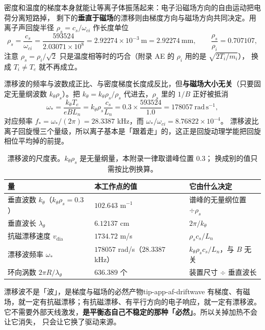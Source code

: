 密度和温度的梯度本身就能让等离子体振荡起来：电子沿磁场方向的自由运动把电荷分离短路掉，
剩下的\textbf{垂直于磁场}的漂移则由梯度方向与磁场方向共同决定。用离子声回旋半径 $\rho_s=c_s/\omega_{ci}$ 作长度单位
\begin{equation}
\rho_s=\frac{c_s}{\omega_{ci}}=\frac{593524}{2.03071\times10^{8}}
=2.92274\times10^{-3}\ \mathrm{m}=2.92274\ \mathrm{mm},
\qquad
\frac{\rho_s}{\rho_i}=0.707107,
\label{eq:app-af-rhos}
\end{equation}
注意 $\rho_s=\rho_i/\sqrt{2}$ 只是温度相等时的巧合（附录 AE 的 $\rho_i$ 用的是 $\sqrt{2T_i/m_i}$），
换成 $T_i\ne T_e$ 就不再成立。

漂移波的频率与波数成正比、与密度梯度长度成反比，但\textbf{与磁场大小无关}（只要固定无量纲波数
$k_\theta\rho_s$）。把 $k_\theta=k_\theta\rho_s/\rho_s$ 代进去，$\rho_s$ 里的 $1/B$ 正好被抵消
\begin{equation}
\omega_*=\frac{k_\theta T_e}{eBL_n}=k_\theta\rho_s\frac{c_s}{L_n}
=0.3\times\frac{593524}{1.0}=178057\ \mathrm{rad\,s^{-1}},
\label{eq:app-af-omega-star}
\end{equation}
对应频率 $f_*=\omega_*/(2\pi)=28.3387$ kHz，而 $\omega_*/\omega_{ci}=8.76822\times10^{-4}$。
漂移波比离子回旋慢三个量级，所以离子基本是「跟着走」的，这正是回旋动理学能把回旋相位平均掉的前提。

\begin{table}[htbp]
\centering
\small
\caption{漂移波的尺度表。$k_\theta\rho_s$ 是无量纲量，本附录一律取谱峰位置 $0.3$；
换成别的值只需按比例换算。}
\label{tab:app-af-driftwave}
\begin{tabular}{p{4.2cm}p{3.4cm}p{5.2cm}}
\toprule
量 & 本工作点的值 & 它由什么决定 \\
\midrule
垂直波数 $k_\theta$（$k_\theta\rho_s=0.3$） & $102.643$ m$^{-1}$ & 谱峰的无量纲位置 $\div\rho_s$ \\
垂直波长 $\lambda_\theta$ & $6.12137$ cm & $2\pi/k_\theta$ \\
抗磁漂移速度 $v_{\mathrm{dia}}$ & $1734.72$ m/s & $\rho_sc_s/L_n$ \\
漂移波频率 $\omega_*$ & $178057$ rad/s（$28.3387$ kHz） & $k_\theta\rho_sc_s/L_n$，与 $B$ 无关 \\
环向涡数 $2\pi R/\lambda_\theta$ & $636.389$ 个 & 装置尺寸 $\div$ 垂直波长 \\
\bottomrule
\end{tabular}

\end{table}

\begin{tip}{漂移波不是「波」，是梯度与磁场的必然产物}{tip-app-af-driftwave}
有梯度、有磁场，就一定有抗磁漂移；有抗磁漂移、有平行方向的电子响应，就一定有漂移波。
它不需要外部天线激发，\textbf{是平衡态自己不稳定的那种「必然」}。所以关掉加热不会让它消失，
只会让它换了驱动来源。
\end{tip}

